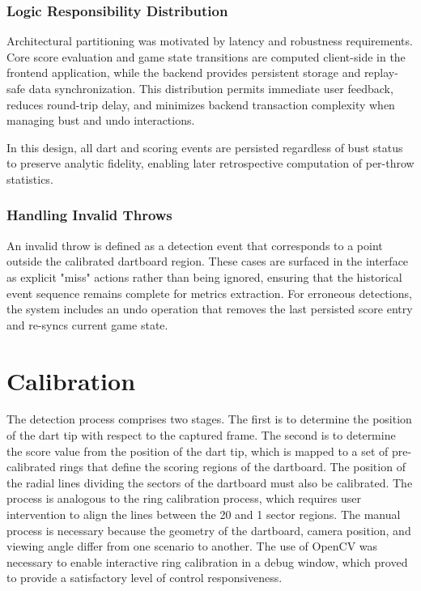 \subsubsection{Logic Responsibility Distribution}
Architectural partitioning was motivated by latency and robustness requirements. Core score evaluation and game state transitions are computed client-side in the frontend application, while the backend provides persistent storage and replay-safe data synchronization. This distribution permits immediate user feedback, reduces round-trip delay, and minimizes backend transaction complexity when managing bust and undo interactions.

In this design, all dart and scoring events are persisted regardless of bust status to preserve analytic fidelity, enabling later retrospective computation of per-throw statistics.

\subsubsection{Handling Invalid Throws}
An invalid throw is defined as a detection event that corresponds to a point outside the calibrated dartboard region. These cases are surfaced in the interface as explicit "miss" actions rather than being ignored, ensuring that the historical event sequence remains complete for metrics extraction. For erroneous detections, the system includes an undo operation that removes the last persisted score entry and re-syncs current game state.

\section{Calibration}
The detection process comprises two stages. The first is to determine the position of the dart tip with respect to the captured frame. The second is to determine the score value from the position of the dart tip, which is mapped to a set of pre-calibrated rings that define the scoring regions of the dartboard. The position of the radial lines dividing the sectors of the dartboard must also be calibrated. The process is analogous to the ring calibration process, which requires user intervention to align the lines between the 20 and 1 sector regions. The manual process is necessary because the geometry of the dartboard, camera position, and viewing angle differ from one scenario to another. The use of OpenCV was necessary to enable interactive ring calibration in a debug window, which proved to provide a satisfactory level of control responsiveness.

